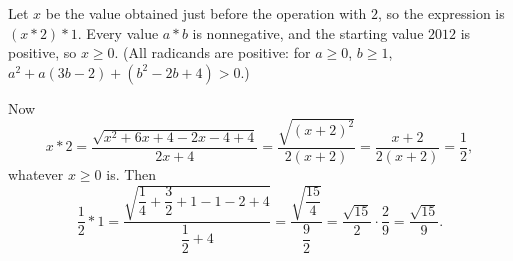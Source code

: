 Let $x$ be the value obtained just before the operation with $2$, so the expression is $(x*2)*1$. Every value $a*b$ is nonnegative, and the starting value $2012$ is positive, so $x\ge0$. (All radicands are positive: for $a\ge0$, $b\ge1$, $a^2+a(3b-2)+(b^2-2b+4)>0$.)

Now
\[x*2=\dfrac{\sqrt{x^2+6x+4-2x-4+4}}{2x+4}=\dfrac{\sqrt{(x+2)^2}}{2(x+2)}=\dfrac{x+2}{2(x+2)}=\dfrac{1}{2},\]
whatever $x\ge0$ is. Then
\[\dfrac{1}{2}*1=\dfrac{\sqrt{\dfrac{1}{4}+\dfrac{3}{2}+1-1-2+4}}{\dfrac{1}{2}+4}=\dfrac{\sqrt{\dfrac{15}{4}}}{\dfrac{9}{2}}=\dfrac{\sqrt{15}}{2}\cdot\dfrac{2}{9}=\boxed{\dfrac{\sqrt{15}}{9}}.\]
